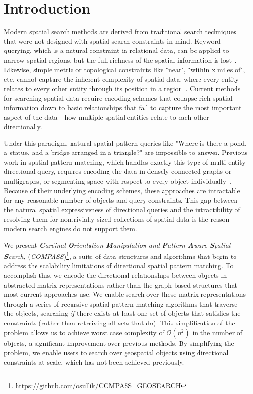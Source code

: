 \section{Introduction}

\label{section:introduction}

Modern spatial search methods are derived from traditional search techniques that were not designed with spatial search constraints in mind.
Keyword querying, which is a natural constraint in relational data, can be applied to narrow spatial regions, but the full richness of the spatial information is lost~\cite{Guo2015, Cao2012, Zhang2009, Osul2023}.
Likewise, simple metric or topological constraints like "near", "within x miles of", etc. cannot capture the inherent complexity of spatial data, where every entity relates to every other entity through its position in a region~\cite{Carniel2020,Bertella2022,Carniel2023}. 
Current methods for searching spatial data require encoding schemes that collapse rich spatial information down to basic relationships that fail to capture the most important aspect of the data - how multiple spatial entities relate to each other directionally.

Under this paradigm, natural spatial pattern queries like "Where is there a pond, a statue, and a bridge arranged in a triangle?" are impossible to answer.
Previous work in spatial pattern matching, which handles exactly this type of multi-entity directional query, requires encoding the data in densely connected graphs or multigraphs, or segmenting space with respect to every object individually~\cite{Folkers2000, Fang2019,Chen2019,Fang2019}.
Because of their underlying encoding schemes, these approaches are intractable for any reasonable number of objects and query constraints.
This gap between the natural spatial expressiveness of directional queries and the intractibility of resolving them for nontrivially-sized collections of spatial data is the reason modern search engines do not support them.

We present \textit{\textbf{C}ardinal \textbf{O}rientation \textbf{M}anipulation and \textbf{P}attern-\textbf{A}ware \textbf{S}patial \textbf{S}earch}, (\emph{COMPASS})\footnote{\url{https://github.com/osullik/COMPASS_GEOSEARCH}}, a suite of data structures and algorithms that begin to address the scalability limitations of directional spatial pattern matching.
To accomplish this, we encode the directional relationships between objects in abstracted matrix representations rather than the graph-based structures that most current approaches use.
We enable search over these matrix representations through a series of recursive spatial pattern-matching algorithms that traverse the objects, searching \emph{if} there exists at least one set of objects that satisfies the constraints (rather than retreiving all sets that do).
This simplification of the problem allows us to achieve worst case complexity of $\mathcal{O}(n^2)$ in the number of objects, a significant improvement over previous methods.
By simplifying the problem, we enable users to search over geospatial objects using directional constraints at scale, which has not been achieved previously.

